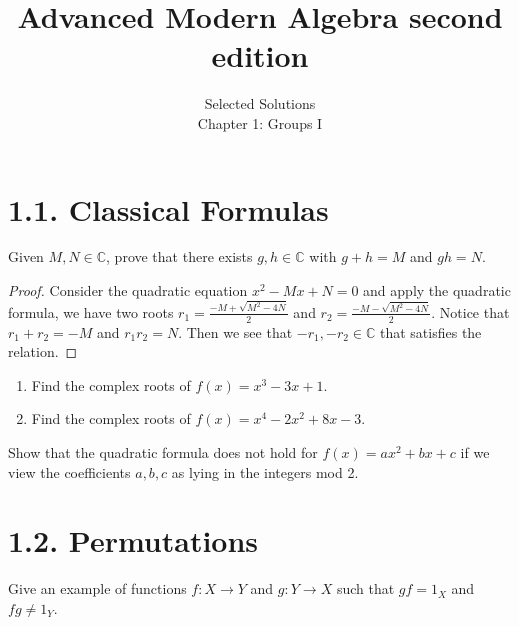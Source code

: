 \documentclass[12pt]{article}
\newenvironment{exercise}[2][Exercise]{\begin{trivlist}
\item[\hskip \labelsep {\bfseries #1}\hskip \labelsep {\bfseries #2.}]}
{\end{trivlist}}
\begin{document}
 
\onehalfspacing
 
\title{Advanced Modern Algebra second edition} 
\author{Selected Solutions\\ 
Chapter 1: Groups I}
 
\maketitle

\section*{1.1.  Classical Formulas}


\begin{exercise}{1.1} 
    Given $M, N \in \mathbb{C}$, prove that there exists $g, h \in \mathbb{C}$ with $g+h=M$ and $gh=N$.
\end{exercise}

\begin{proof}
    Consider the quadratic equation $x^2-Mx+N=0$ and apply the quadratic formula, we have two roots ${r_1 = \frac{-M+ \sqrt{M^2-4N}}2} $ and ${r_2 = \frac{-M - \sqrt{M^2-4N}}2}$. Notice that ${r_1+r_2=-M}$ and ${r_1r_2=N}$. Then we see that $-r_1, -r_2 \in \mathbb{C}$ that satisfies the relation.
\end{proof}


\begin{exercise}{1.3}
    \begin{enumerate}
        \item[(i)] Find the complex roots of $f(x)=x^3-3x+1$.
        \item[(ii)] Find the complex roots of $f(x)=x^4-2x^2+8x-3$.
    \end{enumerate}
\end{exercise}
 




 \begin{exercise}{1.4}
    Show that the quadratic formula does not hold for $f(x)=ax^2+bx+c$ if we view the coefficients $a,b,c$ as lying in the integers mod 2.
 \end{exercise}





\section*{1.2.  Permutations}

 \begin{exercise}{1.5}

 Give an example of functions $f: X\rightarrow Y$ and $g: Y\rightarrow X$ such that $gf = 1_{X}$ and $fg \neq 1_Y$.
 \end{exercise} 
\end{document}
